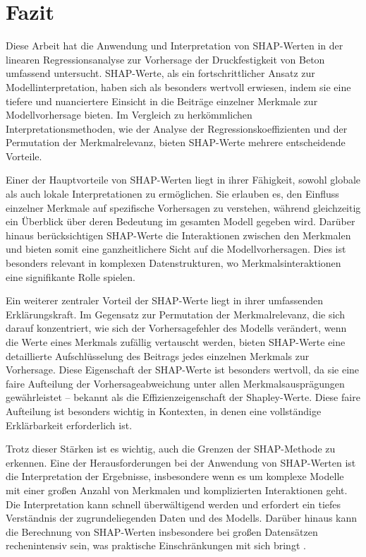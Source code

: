\chapter{Fazit}

Diese Arbeit hat die Anwendung und Interpretation von SHAP-Werten in der 
linearen Regressionsanalyse zur Vorhersage der Druckfestigkeit von Beton umfassend untersucht. 
SHAP-Werte, als ein fortschrittlicher Ansatz zur Modellinterpretation, haben sich als besonders 
wertvoll erwiesen, indem sie eine tiefere und nuanciertere Einsicht in die Beiträge einzelner 
Merkmale zur Modellvorhersage bieten. Im Vergleich zu herkömmlichen Interpretationsmethoden, 
wie der Analyse der Regressionskoeffizienten und der Permutation der Merkmalrelevanz, 
bieten SHAP-Werte mehrere entscheidende Vorteile.

Einer der Hauptvorteile von SHAP-Werten liegt in ihrer Fähigkeit, sowohl globale als auch 
lokale Interpretationen zu ermöglichen. Sie erlauben es, den Einfluss einzelner Merkmale auf 
spezifische Vorhersagen zu verstehen, während gleichzeitig ein Überblick über deren Bedeutung 
im gesamten Modell gegeben wird. Darüber hinaus berücksichtigen SHAP-Werte die Interaktionen 
zwischen den Merkmalen und bieten somit eine ganzheitlichere Sicht auf die Modellvorhersagen. 
Dies ist besonders relevant in komplexen Datenstrukturen, wo Merkmalsinteraktionen eine signifikante
Rolle spielen.

Ein weiterer zentraler Vorteil der SHAP-Werte liegt in ihrer umfassenden Erklärungskraft.
Im Gegensatz zur Permutation der Merkmalrelevanz, die sich darauf konzentriert, wie sich der 
Vorhersagefehler des Modells verändert, wenn die Werte eines Merkmals zufällig vertauscht werden, 
bieten SHAP-Werte eine detaillierte Aufschlüsselung des Beitrags jedes einzelnen Merkmals zur 
Vorhersage. Diese Eigenschaft der SHAP-Werte ist besonders wertvoll, da sie eine faire 
Aufteilung der Vorhersageabweichung unter allen Merkmalsausprägungen gewährleistet – bekannt 
als die Effizienzeigenschaft der Shapley-Werte. Diese faire Aufteilung ist besonders wichtig 
in Kontexten, in denen eine vollständige Erklärbarkeit erforderlich ist.

Trotz dieser Stärken ist es wichtig, auch die Grenzen der SHAP-Methode zu erkennen. 
Eine der Herausforderungen bei der Anwendung von SHAP-Werten ist die Interpretation der Ergebnisse, 
insbesondere wenn es um komplexe Modelle mit einer großen Anzahl von Merkmalen und komplizierten 
Interaktionen geht. Die Interpretation kann schnell überwältigend werden und erfordert ein tiefes 
Verständnis der zugrundeliegenden Daten und des Modells. Darüber hinaus kann die Berechnung von 
SHAP-Werten insbesondere bei großen Datensätzen rechenintensiv sein, was praktische Einschränkungen 
mit sich bringt \cite[S. 224]{Molnar_2022}.

